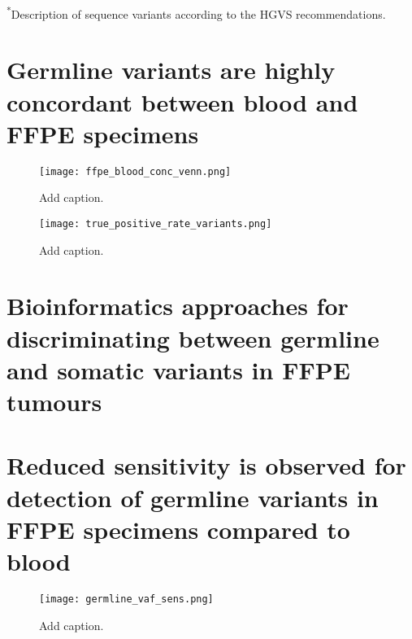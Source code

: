 \noindent\textsuperscript{*}Description of sequence variants according to the HGVS recommendations.


\section{Germline variants are highly concordant between blood and FFPE specimens}
\label{sec:GermlinevariantsarehighlyconcordantbetweenbloodandFFPEspecimens}



\begin{figure}[H]
\centering
	\texttt{[image: ffpe\_blood\_conc\_venn.png]}
	\caption{Add caption.}
	\label{fig:ffpe_blood_conc_venn}
\end{figure}

\begin{figure}[H]
\centering
	\texttt{[image: true\_positive\_rate\_variants.png]}
	\caption{Add caption.}
	\label{fig:true_positive_rate_variants}
\end{figure}


\section{Bioinformatics approaches for discriminating between germline and somatic variants in FFPE tumours}
\label{sec:BioinformaticsapproachesfordiscriminatingbetweengermlineandsomaticstatusesofvariantsinFFPEtumours}


\section{Reduced sensitivity is observed for detection of germline variants in FFPE specimens compared to blood}
\label{sec:ReducedsensitivityisobservedfordetectionofgermlinevariantsinFFPEspecimenscomparedtoblood}

\begin{figure}[H]
	\texttt{[image: germline\_vaf\_sens.png]}
	\caption{Add caption.}
	\label{fig:germline_vaf_sens}
\end{figure}

